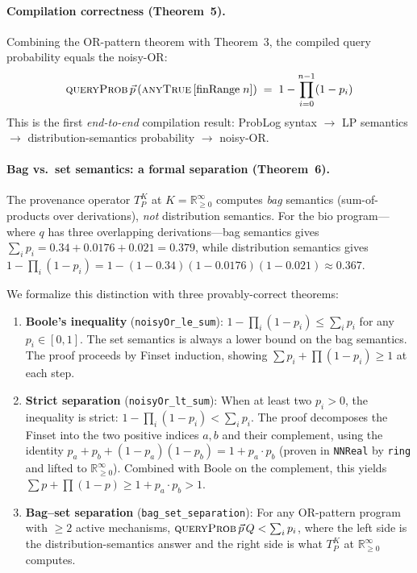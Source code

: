 \documentclass[]{article}
\newcommand{\code}[1]{\texttt{#1}}
\begin{document}
\paragraph{Compilation correctness (Theorem~5).}
Combining the OR-pattern theorem with Theorem~3, the compiled query probability
equals the noisy-OR:
\[
  \textsc{queryProb}\,\vec{p}\,(\textsc{anyTrue}\,[\text{finRange}\;n])
  \;=\; 1 - \prod_{i=0}^{n-1}(1 - p_i)
\]
This is the first \emph{end-to-end} compilation result: ProbLog syntax
$\to$ LP semantics $\to$ distribution-semantics probability $\to$ noisy-OR.

\paragraph{Bag vs.\ set semantics: a formal separation (Theorem~6).}
The provenance operator $T_P^K$ at $K = \mathbb{R}_{\ge 0}^\infty$ computes
\emph{bag} semantics (sum-of-products over derivations), \emph{not} distribution
semantics.  For the bio program---where $q$ has three overlapping derivations---bag
semantics gives $\sum_i p_i = 0.34 + 0.0176 + 0.021 = 0.379$, while distribution
semantics gives $1-\prod_i(1-p_i) = 1-(1-0.34)(1-0.0176)(1-0.021) \approx 0.367$.

We formalize this distinction with three provably-correct theorems:
\begin{enumerate}
\item \textbf{Boole's inequality} (\code{noisyOr\_le\_sum}):
  $1 - \prod_i(1-p_i) \le \sum_i p_i$ for any $p_i \in [0,1]$.
  The set semantics is always a lower bound on the bag semantics.
  The proof proceeds by Finset induction, showing
  $\sum p_i + \prod(1-p_i) \ge 1$ at each step.
\item \textbf{Strict separation} (\code{noisyOr\_lt\_sum}):
  When at least two $p_i > 0$, the inequality is strict:
  $1 - \prod_i(1-p_i) < \sum_i p_i$.
  The proof decomposes the Finset into the two positive indices $a, b$
  and their complement, using the identity
  $p_a + p_b + (1-p_a)(1-p_b) = 1 + p_a \cdot p_b$
  (proven in \code{NNReal} by \code{ring} and lifted to $\mathbb{R}_{\ge 0}^\infty$).
  Combined with Boole on the complement, this yields
  $\sum p + \prod(1-p) \ge 1 + p_a \cdot p_b > 1$.
\item \textbf{Bag--set separation} (\code{bag\_set\_separation}):
  For any OR-pattern program with $\ge 2$ active mechanisms,
  $\textsc{queryProb}\,\vec{p}\,Q < \sum_i p_i$,
  where the left side is the distribution-semantics answer and the right
  side is what $T_P^K$ at $\mathbb{R}_{\ge 0}^\infty$ computes.
\end{enumerate}
\end{document}
